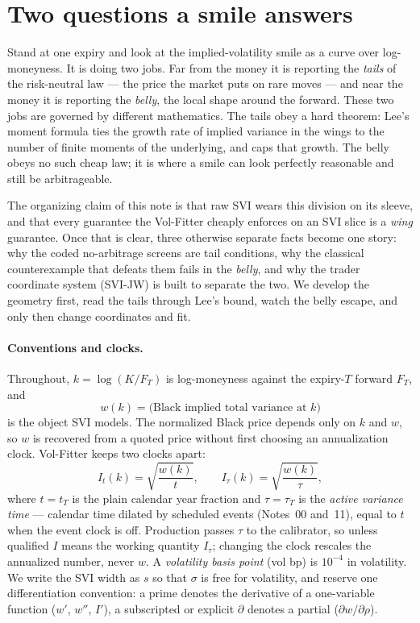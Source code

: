 \documentclass[11pt]{article}
\newcommand{\Iv}{I}                 %
\begin{document}
\newpage
\tableofcontents
\newpage

\section{Two questions a smile answers}
\label{sec:two}

Stand at one expiry and look at the implied-volatility smile as a curve over
log-moneyness.  It is doing two jobs.  Far from the money it is reporting the
\emph{tails} of the risk-neutral law --- the price the market puts on rare
moves --- and near the money it is reporting the \emph{belly}, the local shape
around the forward.  These two jobs are governed by different mathematics.  The
tails obey a hard theorem: Lee's moment formula ties the growth rate of implied
variance in the wings to the number of finite moments of the underlying, and
caps that growth.  The belly obeys no such cheap law; it is where a smile can
look perfectly reasonable and still be arbitrageable.

The organizing claim of this note is that raw SVI wears this division on its
sleeve, and that every guarantee the Vol-Fitter cheaply enforces on an SVI slice
is a \emph{wing} guarantee.  Once that is clear, three otherwise separate facts
become one story: why the coded no-arbitrage screens are tail conditions, why
the classical counterexample that defeats them fails in the \emph{belly}, and
why the trader coordinate system (SVI-JW) is built to separate the two.  We
develop the geometry first, read the tails through Lee's bound, watch the belly
escape, and only then change coordinates and fit.

\paragraph{Conventions and clocks.}
Throughout, $k=\log(K/F_T)$ is log-moneyness against the expiry-$T$ forward
$F_T$, and
\[
w(k)=\text{(Black implied total variance at }k)
\]
is the object SVI models.  The normalized Black price depends only on $k$ and
$w$, so $w$ is recovered from a quoted price without first choosing an
annualization clock.  Vol-Fitter keeps two clocks apart:
\begin{equation}
\Iv_t(k)=\sqrt{\frac{w(k)}{t}},\qquad
\Iv_\tau(k)=\sqrt{\frac{w(k)}{\tau}},
\label{eq:clocks}
\end{equation}
where $t=t_T$ is the plain calendar year fraction and $\tau=\tau_T$ is the
\emph{active variance time} --- calendar time dilated by scheduled events
(Notes~00 and~11), equal to $t$ when the event clock is off.  Production passes
$\tau$ to the calibrator, so unless qualified $\Iv$ means the working quantity
$\Iv_\tau$; changing the clock rescales the annualized number, never $w$.  A
\emph{volatility basis point} (vol bp) is $10^{-4}$ in volatility.  We write the
SVI width as $s$ so that $\sigma$ is free for volatility, and reserve one
differentiation convention: a prime denotes the derivative of a one-variable
function ($w'$, $w''$, $\Iv'$), a subscripted or explicit $\partial$ denotes a
partial ($\partial w/\partial\rho$).
\end{document}
